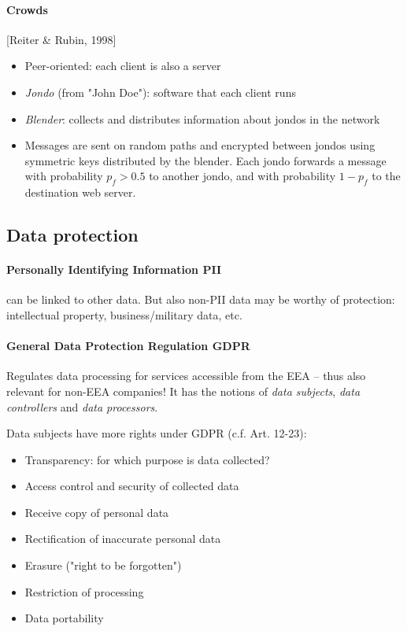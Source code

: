 \horizontaldivider

\paragraph{Crowds} [Reiter \& Rubin, 1998]
\begin{itemize}
    \item Peer-oriented: each client is also a server
    \item \emph{Jondo} (from "John Doe"): software that each client runs
    \item \emph{Blender}: collects and distributes information about jondos in the network
    \item Messages are sent on random paths and encrypted between jondos using symmetric keys distributed by the blender.
    Each jondo forwards a message with probability $p_f > 0.5$ to another jondo, and with probability $1-p_f$ to the destination web server.
\end{itemize}


\pagebreak
\subsection{Data protection}

\paragraph{Personally Identifying Information PII} can be linked to other data. But also non-PII data may be worthy of protection: intellectual property, business/military data, etc.

\paragraph{General Data Protection Regulation GDPR} Regulates data processing for services accessible from the EEA -- thus also relevant for non-EEA companies! It has the notions of \emph{data subjects}, \emph{data controllers} and \emph{data processors}.

Data subjects have more rights under GDPR (c.f. Art. 12-23):
\begin{itemize}
    \item Transparency: for which purpose is data collected?
    \item Access control and security of collected data
    \item Receive copy of personal data
    \item Rectification of inaccurate personal data
    \item Erasure ("right to be forgotten")
    \item Restriction of processing
    \item Data portability
\end{itemize}

